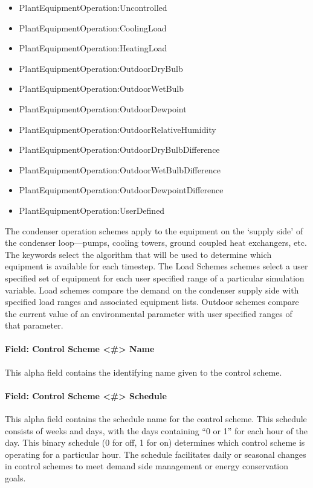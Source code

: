 \begin{itemize}
\item
  PlantEquipmentOperation:Uncontrolled
\item
  PlantEquipmentOperation:CoolingLoad
\item
  PlantEquipmentOperation:HeatingLoad
\item
  PlantEquipmentOperation:OutdoorDryBulb
\item
  PlantEquipmentOperation:OutdoorWetBulb
\item
  PlantEquipmentOperation:OutdoorDewpoint
\item
  PlantEquipmentOperation:OutdoorRelativeHumidity
\item
  PlantEquipmentOperation:OutdoorDryBulbDifference
\item
  PlantEquipmentOperation:OutdoorWetBulbDifference
\item
  PlantEquipmentOperation:OutdoorDewpointDifference
\item
  PlantEquipmentOperation:UserDefined
\end{itemize}

The condenser operation schemes apply to the equipment on the `supply side' of the condenser loop---pumps, cooling towers, ground coupled heat exchangers, etc. The keywords select the algorithm that will be used to determine which equipment is available for each timestep. The Load Schemes schemes select a user specified set of equipment for each user specified range of a particular simulation variable. Load schemes compare the demand on the condenser supply side with specified load ranges and associated equipment lists. Outdoor schemes compare the current value of an environmental parameter with user specified ranges of that parameter.

\paragraph{Field: Control Scheme \textless{}\#\textgreater{} Name}\label{field-control-scheme-name-1}

This alpha field contains the identifying name given to the control scheme.

\paragraph{Field: Control Scheme \textless{}\#\textgreater{} Schedule}\label{field-control-scheme-schedule-1}

This alpha field contains the schedule name for the control scheme. This schedule consists of weeks and days, with the days containing ``0 or 1'' for each hour of the day. This binary schedule (0 for off, 1 for on) determines which control scheme is operating for a particular hour. The schedule facilitates daily or seasonal changes in control schemes to meet demand side management or energy conservation goals.

